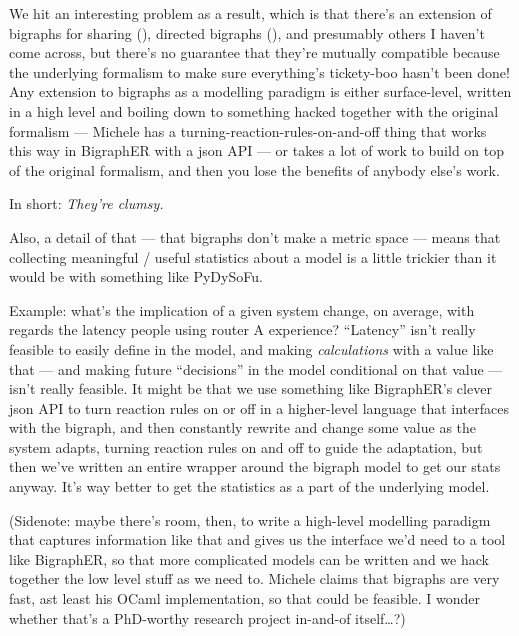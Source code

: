 \documentclass{article}
\begin{document}
We hit an interesting problem as a result, which is that there's an extension of bigraphs for sharing
(\cite{michele:sharingbigraphs}), directed bigraphs (\cite{grohmann:directedbigraphs}), and presumably others I haven't
come across, but there's no guarantee that they're mutually compatible because the underlying formalism to make sure
everything's tickety-boo hasn't been done! Any extension to bigraphs as a modelling paradigm is either surface-level,
written in a high level and boiling down to something hacked together with the original formalism --- Michele has a
turning-reaction-rules-on-and-off thing that works this way in BigraphER with a json API --- or takes a lot of work to
build on top of the original formalism, and then you lose the benefits of anybody else's work.\par

In short: \emph{They're clumsy.}\par

Also, a detail of that --- that bigraphs don't make a metric space --- means that collecting meaningful / useful
statistics about a model is a little trickier than it would be with something like PyDySoFu.\par

Example: what's the implication of a given system change, on average, with regards the latency people using router A
experience? ``Latency'' isn't really feasible to easily define in the model, and making \emph{calculations} with a value
like that --- and making future ``decisions'' in the model conditional on that value --- isn't really feasible. It might
be that we use something like BigraphER's clever json API to turn reaction rules on or off in a higher-level language
that interfaces with the bigraph, and then constantly rewrite and change some value as the system adapts, turning
reaction rules on and off to guide the adaptation, but then we've written an entire wrapper around the bigraph model to
get our stats anyway. It's way better to get the statistics as a part of the underlying model.\par

(Sidenote: maybe there's room, then, to write a high-level modelling paradigm that captures information like that and
gives us the interface we'd need to a tool like BigraphER, so that more complicated models can be written and we hack
together the low level stuff as we need to. Michele claims that bigraphs are very fast, ast least his OCaml
implementation, so that could be feasible. I wonder whether that's a PhD-worthy research project in-and-of
itself\ldots{}?)\par
\end{document}
